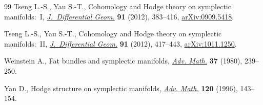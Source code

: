 \begin{thebibliography}{99}
Tseng L.-S., Yau S.-T., Cohomology and {H}odge theory on symplectic
 manifolds:~{I}, \href{https://doi.org/10.4310/jdg/1349292670}{\textit{J.~Differential Geom.}} \textbf{91} (2012), 383--416,
 \href{https://arxiv.org/abs/0909.5418}{arXiv:0909.5418}.

Tseng L.-S., Yau S.-T., Cohomology and {H}odge theory on symplectic
 manifolds:~{II}, \href{https://doi.org/10.4310/jdg/1349292671}{\textit{J.~Differential Geom.}} \textbf{91} (2012), 417--443,
 \href{https://arxiv.org/abs/1011.1250}{arXiv:1011.1250}.

Weinstein A., Fat bundles and symplectic manifolds, \href{https://doi.org/10.1016/0001-8708(80)90035-3}{\textit{Adv. Math.}}
 \textbf{37} (1980), 239--250.

Yan D., Hodge structure on symplectic manifolds, \href{https://doi.org/10.1006/aima.1996.0034}{\textit{Adv. Math.}}
 \textbf{120} (1996), 143--154.

\end{thebibliography}
